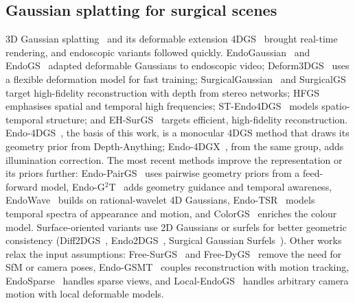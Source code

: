 \documentclass[conference]{IEEEtran}
\begin{document}
\subsection{Gaussian splatting for surgical scenes}
3D Gaussian splatting~\cite{kerbl2023gaussian} and its deformable extension 4DGS~\cite{wu2024_4dgs} brought real-time rendering, and endoscopic variants followed quickly. EndoGaussian~\cite{liu2024endogaussian} and EndoGS~\cite{zhu2024endogs} adapted deformable Gaussians to endoscopic video; Deform3DGS~\cite{yang2024deform3dgs} uses a flexible deformation model for fast training; SurgicalGaussian~\cite{xie2024surgicalgaussian} and SurgicalGS~\cite{chen2024surgicalgs} target high-fidelity reconstruction with depth from stereo networks; HFGS~\cite{zhao2024hfgs} emphasises spatial and temporal high frequencies; ST-Endo4DGS~\cite{li2024stendo4dgs} models spatio-temporal structure; and EH-SurGS~\cite{shan2025ehsurgs} targets efficient, high-fidelity reconstruction. Endo-4DGS~\cite{huang2024endo4dgs}, the basis of this work, is a monocular 4DGS method that draws its geometry prior from Depth-Anything; Endo-4DGX~\cite{huang2025endo4dgx}, from the same group, adds illumination correction. The most recent methods improve the representation or its priors further: Endo-PairGS~\cite{yu2026endopairgs} uses pairwise geometry priors from a feed-forward model, Endo-G$^2$T~\cite{liu2025endog2t} adds geometry guidance and temporal awareness, EndoWave~\cite{wu2025endowave} builds on rational-wavelet 4D Gaussians, Endo-TSR~\cite{wu2026endotsr} models temporal spectra of appearance and motion, and ColorGS~\cite{ji2025colorgs} enriches the colour model. Surface-oriented variants use 2D Gaussians or surfels for better geometric consistency (Diff2DGS~\cite{song2026diff2dgs}, Endo2DGS~\cite{zhou2026endo2dgs}, Surgical Gaussian Surfels~\cite{sunmola2026sgs}). Other works relax the input assumptions: Free-SurGS~\cite{guo2024freesurgs} and Free-DyGS~\cite{li2024freedygs} remove the need for SfM or camera poses, Endo-GSMT~\cite{gou2025endogsmt} couples reconstruction with motion tracking, EndoSparse~\cite{li2024endosparse} handles sparse views, and Local-EndoGS~\cite{shan2026localendogs} handles arbitrary camera motion with local deformable models.
\end{document}
